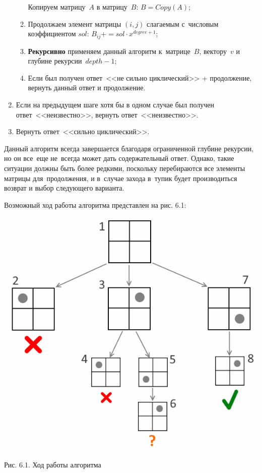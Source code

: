 \begin{enumerate}
\begin{enumerate}
                Копируем матрицу~$A$ в матрицу~$B$: $B = Copy(A)$;
            \item
                Продолжаем элемент матрицы $(i, j)$ слагаемым с~числовым коэффициентом $sol$:
                $B_{ij} += sol \cdot x^{degree + 1}$;
            \item
                \textbf{Рекурсивно} применяем данный алгоритм
                к~матрице~$B$, вектору~$v$ и глубине рекурсии~$depth - 1$;
            \item
                Если был получен ответ~<<не сильно циклический>> + продолжение, вернуть данный ответ и продолжение.
        \end{enumerate}
    \item
        Если на предыдущем шаге хотя бы в одном случае был получен ответ~<<неизвестно>>, вернуть ответ~<<неизвестно>>.
    \item
        Вернуть ответ~<<сильно циклический>>.
\end{enumerate}

Данный алгоритм всегда завершается благодаря ограниченной глубине рекурсии,
но он все~еще не~всегда может дать содержательный ответ.
Однако, такие ситуации должны быть более редкими, поскольку перебираются все элементы матрицы для~продолжения,
и в~случае захода в~тупик будет производиться возврат и выбор следующего варианта.

Возможный ход работы алгоритма представлен на рис. 6.1:

\begin{center}
    \includegraphics[scale=0.6]{pictures/recursion.png}

    \small
    Рис. 6.1. Ход работы алгоритма
\end{center}

